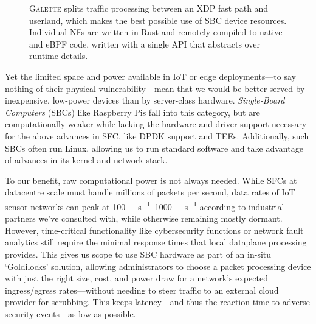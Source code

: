 \documentclass[comsoc, conference, times]{IEEEtran}
\newcommand{\ourtech}{\textsc{Galette}}
\newcommand{\af}{(\texttt{AF\_})XDP}
\begin{document}
\begin{figure}
	\centering
	\resizebox{0.9\linewidth}{!}{}
	\caption{\ourtech{} splits traffic processing between an XDP fast path and userland, which makes the best possible use of SBC device resources. Individual NFs are written in Rust and remotely compiled to native and eBPF code, written with a single API that abstracts over runtime details.\label{fig:arch}}
\end{figure}

Yet the limited space and power available in IoT or edge deployments---to say nothing of their physical vulnerability---mean that we would be better served by inexpensive, low-power devices than by server-class hardware.
\emph{Single-Board Computers} (SBCs) like Raspberry Pis fall into this category, but are computationally weaker while lacking the hardware and driver support necessary for the above advances in SFC, like DPDK support and TEEs.
Additionally, such SBCs often run Linux, allowing us to run standard software and take advantage of advances in its kernel and network stack.%

To our benefit, raw computational power is not always needed.
While SFCs at datacentre scale must handle millions of packets per second, data rates of IoT sensor networks can peak at \qtyrange{100}{1000}{\kilo\bit\per\second} according to industrial partners we've consulted with, while otherwise remaining mostly dormant.
However, time-critical functionality like cybersecurity functions or network fault analytics still require the minimal response times that local dataplane processing provides.
This gives us scope to use SBC hardware as part of an in-situ `Goldilocks' solution, allowing administrators to choose a packet processing device with just the right size, cost, and power draw for a network's expected ingress/egress rates---without needing to steer traffic to an external cloud provider for scrubbing.
This keeps latency---and thus the reaction time to adverse security events---as low as possible.


\end{document}
